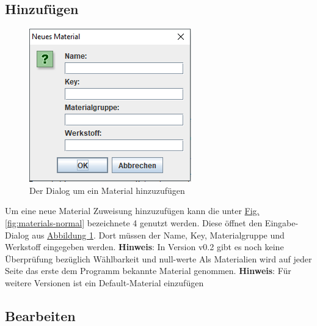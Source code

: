 \documentclass{book}
\newcommand{\hinweis}[1]{\newline \textbf{Hinweis}: #1 \newline}
\begin{document}
			\subsection{Hinzufügen}	\label{[material-hinzufuegen}		
				\begin{figure}
					\includegraphics[scale=0.48]{pics/assisttool/materials-add.PNG}
					\caption{Der Dialog um ein Material hinzuzufügen}
					\label{fig:materials add}
				\end{figure}
				Um eine neue Material Zuweisung hinzuzufügen kann die unter \hyperref[fig:materials-normal]{Fig. \ref{fig:materials-normal}} bezeichnete 4 genutzt werden. Diese öffnet den Eingabe-Dialog aus \hyperref[fig:materials add]{Abbildung \ref{fig:materials add}}. Dort müssen der Name, Key, Materialgruppe und Werkstoff eingegeben werden. 
				\hinweis{In Version v0.2 gibt es noch keine Überprüfung bezüglich Wählbarkeit und null-werte}
				Als Materialien wird auf jeder Seite das erste dem Programm bekannte Material genommen.
				\hinweis{Für weitere Versionen ist ein Default-Material einzufügen}
			\subsection{Bearbeiten}
				
\end{document}
